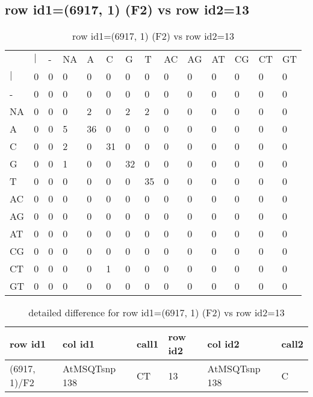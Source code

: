 \subsection{row id1=(6917, 1) (F2) vs row id2=13}
\begin{center}
\begin{longtable}{|l|l|l|l|l|l|l|l|l|l|l|l|l|l|}
\caption{row id1=(6917, 1) (F2) vs row id2=13} \label{table_dm100}\\
\hline
\\
\hline
&$|$&-&NA&A&C&G&T&AC&AG&AT&CG&CT&GT\\
$|$&0&0&0&0&0&0&0&0&0&0&0&0&0\\
-&0&0&0&0&0&0&0&0&0&0&0&0&0\\
NA&0&0&0&2&0&2&2&0&0&0&0&0&0\\
A&0&0&5&36&0&0&0&0&0&0&0&0&0\\
C&0&0&2&0&31&0&0&0&0&0&0&0&0\\
G&0&0&1&0&0&32&0&0&0&0&0&0&0\\
T&0&0&0&0&0&0&35&0&0&0&0&0&0\\
AC&0&0&0&0&0&0&0&0&0&0&0&0&0\\
AG&0&0&0&0&0&0&0&0&0&0&0&0&0\\
AT&0&0&0&0&0&0&0&0&0&0&0&0&0\\
CG&0&0&0&0&0&0&0&0&0&0&0&0&0\\
CT&0&0&0&0&1&0&0&0&0&0&0&0&0\\
GT&0&0&0&0&0&0&0&0&0&0&0&0&0\\
\hline
\end{longtable}
\end{center}

\begin{center}
\begin{longtable}{|l|l|l|l|l|l|}
\caption{detailed difference for row id1=(6917, 1) (F2) vs row id2=13} \label{table_dm101}\\
\hline
row id1&col id1&call1&row id2&col id2&call2\\
\hline
(6917, 1)/F2&AtMSQTsnp 138&CT&13&AtMSQTsnp 138&C\\
\hline
\end{longtable}
\end{center}

